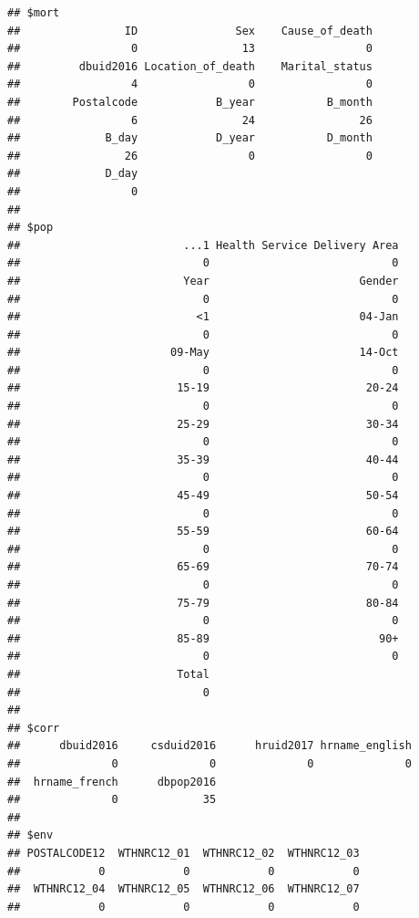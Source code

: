 \documentclass[
  11pt,
  oneside]{book}
\begin{document}
\begin{verbatim}
## $mort
##                ID               Sex    Cause_of_death 
##                 0                13                 0 
##         dbuid2016 Location_of_death    Marital_status 
##                 4                 0                 0 
##        Postalcode            B_year           B_month 
##                 6                24                26 
##             B_day            D_year           D_month 
##                26                 0                 0 
##             D_day 
##                 0 
## 
## $pop
##                         ...1 Health Service Delivery Area 
##                            0                            0 
##                         Year                       Gender 
##                            0                            0 
##                           <1                       04-Jan 
##                            0                            0 
##                       09-May                       14-Oct 
##                            0                            0 
##                        15-19                        20-24 
##                            0                            0 
##                        25-29                        30-34 
##                            0                            0 
##                        35-39                        40-44 
##                            0                            0 
##                        45-49                        50-54 
##                            0                            0 
##                        55-59                        60-64 
##                            0                            0 
##                        65-69                        70-74 
##                            0                            0 
##                        75-79                        80-84 
##                            0                            0 
##                        85-89                          90+ 
##                            0                            0 
##                        Total 
##                            0 
## 
## $corr
##      dbuid2016     csduid2016      hruid2017 hrname_english 
##              0              0              0              0 
##  hrname_french      dbpop2016 
##              0             35 
## 
## $env
## POSTALCODE12  WTHNRC12_01  WTHNRC12_02  WTHNRC12_03 
##            0            0            0            0 
##  WTHNRC12_04  WTHNRC12_05  WTHNRC12_06  WTHNRC12_07 
##            0            0            0            0
\end{verbatim}
\end{document}
